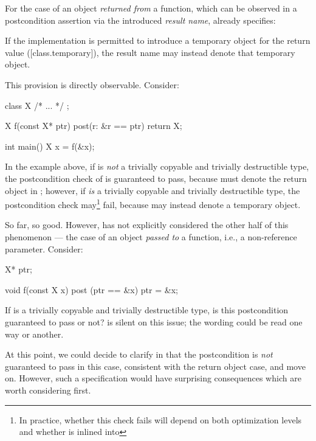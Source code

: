 For the case of an object \emph{returned from} a function, which can be observed in a postcondition assertion via the introduced \emph{result name}, \cite{P2900R10} already specifies:

\begin{adjustwidth}{0.5cm}{0.5cm}
If the implementation is permitted to introduce a temporary object for the return value
([class.temporary]), the result name may instead denote that temporary object.
\end{adjustwidth}

This provision is directly observable. Consider:

\begin{codeblock}
class X { /* ... */ };

X f(const X* ptr) post(r: &r == ptr) {
  return X{};
}

int main() {
  X x = f(&x);
}
\end{codeblock}

In the example above, if  is \emph{not} a trivially copyable and trivially destructible type, the postcondition check of  is guaranteed to pass, because  must denote the return object  in ; however, if  \emph{is} a trivially copyable and trivially destructible type, the postcondition check may\footnote{In practice, whether this check fails will depend on both optimization levels and whether  is inlined into } fail, because  may instead denote a temporary object.

So far, so good. However, \cite{P2900R10} has not explicitly considered the other half of this phenomenon --- the case of an object \emph{passed to} a function, i.e., a non-reference parameter. Consider:

\begin{codeblock}
X* ptr;

void f(const X x) post (ptr == &x) {
  ptr = &x;
}
\end{codeblock}
If  is a trivially copyable and trivially destructible type, is this postcondition guaranteed to pass or not? \cite{P2900R10} is silent on this issue; the wording could be read one way or another.

At this point, we could decide to clarify in \cite{P2900R10} that the postcondition is \emph{not} guaranteed to pass in this case, consistent with the return object case, and move on. However, such a specification would have surprising consequences which are worth considering first.

